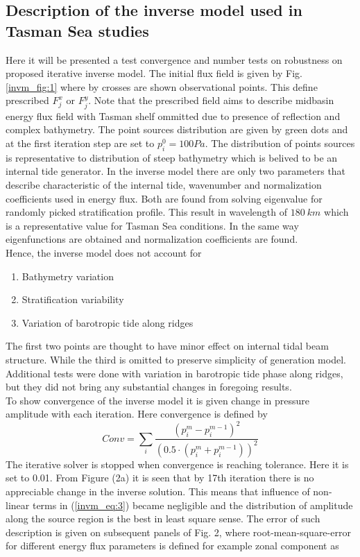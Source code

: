 \subsection{Description of the inverse model used in Tasman Sea studies}
Here it will be presented a test convergence and number tests on robustness on proposed iterative inverse model. The initial flux field is given by Fig. \ref{invm_fig:1} where by crosses are shown observational points. This define prescribed $F_{j}^x$ or $F_{j}^y$. Note that the prescribed field aims to describe midbasin energy flux field with Tasman shelf ommitted due to presence of reflection and complex bathymetry. The point sources distribution are given by green dots and at the first iteration step are set to $p^0_i = 100 Pa$. The distribution of points sources is representative to distribution of steep bathymetry which is belived to be an internal tide generator. In the inverse model there are only two parameters that describe characteristic of the internal tide, wavenumber and normalization coefficients used in energy flux. Both are found from solving eigenvalue for randomly picked stratification profile. This result in wavelength of $180~km$ which is a representative value for Tasman Sea conditions. In the same way eigenfunctions are obtained and normalization coefficients are found.\\
Hence, the inverse model does not account for
\begin{enumerate}
\item Bathymetry variation
\item Stratification variability
\item Variation of barotropic tide along ridges
\end{enumerate}
The first two points are thought to have minor effect on internal tidal beam structure. While the third is omitted to preserve simplicity of generation model. Additional tests were done with variation in barotropic tide phase along ridges, but they did not bring any substantial changes in foregoing results.\\
To show convergence of the inverse model it is given change in pressure amplitude with each iteration. Here convergence is defined by
\begin{equation*}
Conv = \sum_i \frac{(p_i^m - p_i^{m-1})^2}{(0.5 \cdot (p_i^m + p_i^{m-1}))^2}
\end{equation*}
The iterative solver is stopped when convergence is reaching tolerance. Here it is set to 0.01. From Figure (2a) it is seen that by 17th iteration there is no appreciable change in the inverse solution. This means that influence of non-linear terms in (\ref{invm_eq:3}) became negligible and the distribution of amplitude along the source region is the best in least square sense. The error of such description is given on subsequent panels of Fig. 2, where root-mean-square-error for different energy flux parameters is defined for example zonal component as
